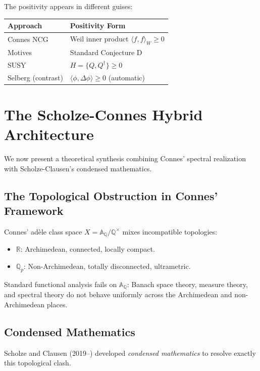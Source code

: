 \documentclass[12pt, a4paper]{article}
\theoremstyle{definition}
\newcommand{\Q}{\mathbb{Q}}
\newcommand{\R}{\mathbb{R}}
\newcommand{\A}{\mathbb{A}}
\begin{document}
The positivity appears in different guises:
\begin{center}
\begin{tabular}{|l|l|}
\hline
\textbf{Approach} & \textbf{Positivity Form} \\
\hline
Connes NCG & Weil inner product $\langle f, f \rangle_W \geq 0$ \\
Motives & Standard Conjecture D \\
SUSY & $H = \{Q, Q^\dagger\} \geq 0$ \\
Selberg (contrast) & $\langle \phi, \Delta \phi \rangle \geq 0$ (automatic) \\
\hline
\end{tabular}
\end{center}

\section{The Scholze-Connes Hybrid Architecture}

We now present a theoretical synthesis combining Connes' spectral realization with Scholze-Clausen's condensed mathematics.

\subsection{The Topological Obstruction in Connes' Framework}

Connes' ad\`ele class space $X = \A_\Q / \Q^\times$ mixes incompatible topologies:
\begin{itemize}
\item $\R$: Archimedean, connected, locally compact.
\item $\Q_p$: Non-Archimedean, totally disconnected, ultrametric.
\end{itemize}

Standard functional analysis fails on $\A_\Q$: Banach space theory, measure theory, and spectral theory do not behave uniformly across the Archimedean and non-Archimedean places.

\subsection{Condensed Mathematics}

Scholze and Clausen (2019--) developed \textit{condensed mathematics} to resolve exactly this topological clash.
\end{document}
